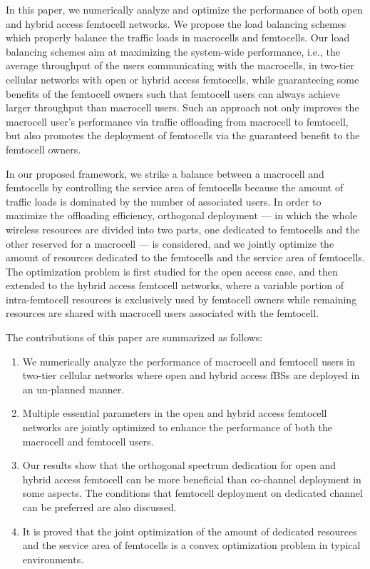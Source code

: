 \documentclass[journal]{IEEEtran}
\begin{document}
In this paper, we numerically analyze and optimize the performance of both open and hybrid access femtocell
networks. We propose the load balancing schemes which properly balance the traffic loads in macrocells and femtocells. Our load balancing schemes aim at maximizing the system-wide performance,
i.e., the average throughput of the users communicating with the macrocells,
in two-tier cellular networks with open or hybrid access femtocells,
while guaranteeing some benefits of the femtocell owners
such that femtocell users can always achieve larger throughput than macrocell users.
Such an approach not only improves the macrocell user's performance via traffic offloading from macrocell to femtocell, but also promotes the deployment of femtocells via the guaranteed benefit to the femtocell owners.

In our proposed framework, we strike a balance between a macrocell and femtocells by controlling the service area of femtocells because the amount of traffic loads is dominated by the number of associated users.
In order to maximize the offloading efficiency, orthogonal deployment --- in which
the whole wireless resources are divided into two parts, one dedicated to femtocells and the other reserved for a macrocell --- is considered, and we jointly optimize the amount of resources dedicated to the femtocells and the service area of femtocells.
The optimization problem is first studied for the open access case, and then extended to the hybrid access femtocell networks, where a variable portion of intra-femtocell resources is exclusively used by femtocell owners while remaining resources are shared with macrocell users associated with the femtocell.

The contributions of this paper are summarized as follows:
\begin{enumerate}
\item We numerically analyze the performance of macrocell and femtocell users in two-tier cellular networks
where open and hybrid access fBSs are deployed in an un-planned manner.
\item Multiple essential parameters in the open and hybrid access femtocell networks are jointly optimized
to enhance the performance of both the macrocell and femtocell users.
\item Our results show that the orthogonal spectrum dedication for open and hybrid access femtocell can be more beneficial than co-channel deployment in some aspects. The conditions that femtocell deployment on dedicated channel can be preferred are also discussed.
\item It is proved that the joint optimization of the amount of dedicated resources and the service area of
femtocells is a convex optimization problem in typical environments.
\end{enumerate}
\end{document}
